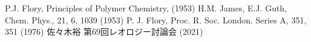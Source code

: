 \begin{columns}[totalwidth=.85\linewidth]
    \column{\textwidth}
    \vspace{-10mm}
        \beamertemplatetextbibitems
        \small
        \begin{thebibliography}{99}
             P.J. Flory, Principles of Polymer Chemistry, (1953)
             H.M. James, E.J. Guth, Chem. Phys., 21, 6, 1039 (1953)
             P. J. Flory, Proc. R. Soc. London. Series A, 351, 351 (1976)
             佐々木裕 第69回レオロジー討論会 (2021)
        \end{thebibliography}
    \end{columns}
